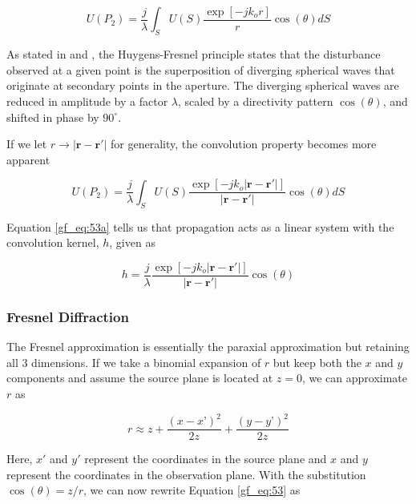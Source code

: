 \begin{equation}
\boxed{U(P_2) =\frac{j}{\lambda}\int_S U(S)\frac{\exp\left[-jk_o r\right]}{r}\cos(\theta)dS}
\label{gf_eq:53}
\end{equation}
\renewcommand{\baselinestretch}{2} \small\normalsize

As stated in \cite{goodman_fourier} and \cite{gaskill_fourier}, the Huygens-Fresnel principle states that the disturbance observed at a given point is the superposition of diverging spherical waves that originate at secondary points in the aperture. The diverging spherical waves are reduced in amplitude by a factor $\lambda$, scaled by a directivity pattern $\cos(\theta)$, and shifted in phase by $90^{\circ}$.

\noindent If we let $r \rightarrow |\mathbf{r}-\mathbf{r}'|$ for generality, the convolution property becomes more apparent

\begin{equation}
U(P_2) =\frac{j}{\lambda}\int_S U(S)\frac{\exp\left[-jk_o |\mathbf{r}-\mathbf{r}'|\right]}{|\mathbf{r}-\mathbf{r}'|}\cos(\theta)dS
\label{gf_eq:53a}
\end{equation}
\renewcommand{\baselinestretch}{2} \small\normalsize

Equation \ref{gf_eq:53a} tells us that propagation acts as a linear system with the convolution kernel, $h$, given as

\begin{equation}
h=\frac{j}{\lambda}\frac{\exp\left[-jk_o |\mathbf{r}-\mathbf{r}'|\right]}{|\mathbf{r}-\mathbf{r}'|}\cos(\theta)
\label{gf_eq:53b}
\end{equation}
\renewcommand{\baselinestretch}{2} \small\normalsize

\subsubsection{Fresnel Diffraction}
The Fresnel approximation is essentially the paraxial approximation but retaining all 3 dimensions. If we take a binomial expansion of $r$ but keep both the $x$ and $y$ components and assume the source plane is located at $z=0$, we can approximate $r$ as

\begin{equation}
r\approx z + \frac{(x-x’)^2}{2z}+\frac{(y-y’)^2}{2z}
\label{gf_eq:53c}
\end{equation}
\renewcommand{\baselinestretch}{2} \small\normalsize

Here, $x'$ and $y'$ represent the coordinates in the source plane and $x$ and $y$ represent the coordinates in the observation plane. With the substitution $\cos(\theta) = z/r$, we can now rewrite Equation \ref{gf_eq:53} as

